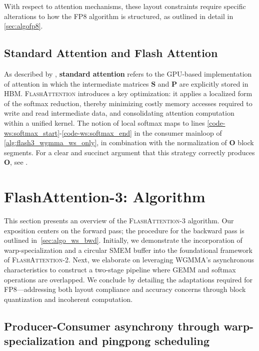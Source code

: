 With respect to attention mechanisms, these layout constraints require specific alterations to how the FP8 algorithm is structured, as outlined in detail in \cref{sec:algofp8}.

\subsection{Standard Attention and Flash Attention} As described by \citet{dao2022flashattention}, \textbf{standard attention} refers to the GPU-based implementation of attention in which the intermediate matrices $\mathbf{S}$ and $\mathbf{P}$ are explicitly stored in HBM. \textsc{FlashAttention} introduces a key optimization: it applies a localized form of the softmax reduction, thereby minimizing costly memory accesses required to write and read intermediate data, and consolidating attention computation within a unified kernel. The notion of local softmax maps to lines \ref{code-ws:softmax_start}-\ref{code-ws:softmax_end} in the consumer mainloop of \cref{alg:flash3_wgmma_ws_only}, in combination with the normalization of $\mathbf{O}$ block segments. For a clear and succinct argument that this strategy correctly produces $\mathbf{O}$, see \cite[\S 2.3.1]{dao2023flashattention2}.

\section{FlashAttention-3: Algorithm}
\label{sec:algo}

This section presents an overview of the \textsc{FlashAttention-3} algorithm. Our exposition centers on the forward pass; the procedure for the backward pass is outlined in~\cref{sec:algo_ws_bwd}. Initially, we demonstrate the incorporation of warp-specialization and a circular SMEM buffer into the foundational framework of \textsc{FlashAttention-2}. Next, we elaborate on leveraging WGMMA’s asynchronous characteristics to construct a two-stage pipeline where GEMM and softmax operations are overlapped. We conclude by detailing the adaptations required for FP8—addressing both layout compliance and accuracy concerns through block quantization and incoherent computation.

\subsection{Producer-Consumer asynchrony through warp-specialization and pingpong scheduling}
\label{sec:algo_ws}

